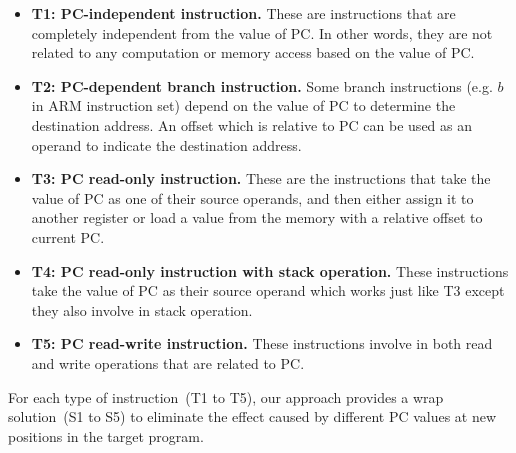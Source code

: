 \begin{itemize}

\item \textbf{T1: PC-independent instruction.} These are instructions that are completely independent from the value of PC. In other words, they are not related to any computation or memory access based on the value of PC.

\item \textbf{T2: PC-dependent branch instruction.} Some branch instructions (e.g. $b$ in ARM instruction set) depend on the value of PC to determine the destination address. An offset which is relative to PC can be used as an operand to indicate the destination address.
 
\item \textbf{T3: PC read-only instruction.} These are the instructions that take the value of PC as one of their source operands, and then either assign it to another register or load a value from the memory with a relative offset to current PC.

\item \textbf{T4: PC read-only instruction with stack operation.} These instructions take the value of PC as their source operand which works just like T3 except they also involve in stack operation.

\item \textbf{T5: PC read-write instruction.} These instructions involve in both read and write operations that are related to PC.

\end{itemize}

 For each type of instruction~(T1 to T5), our approach provides a wrap solution~(S1 to S5) to eliminate the effect caused by different PC values at new positions in the target program.

